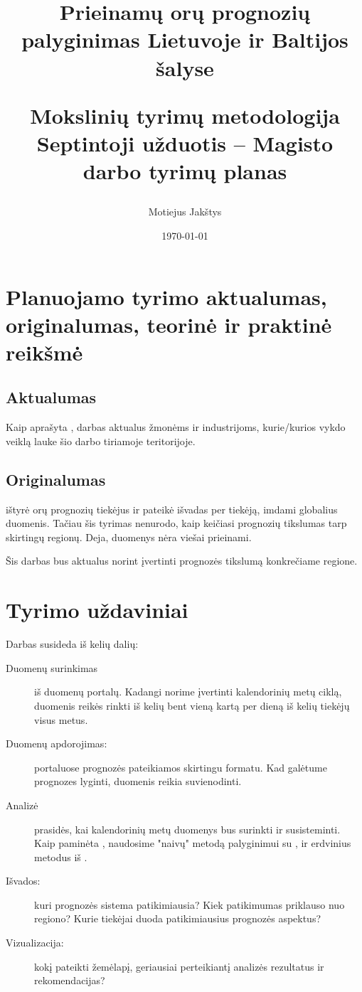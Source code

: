 \documentclass{article}
\title{
    Prieinamų orų prognozių palyginimas Lietuvoje ir Baltijos šalyse \\ \vspace{4mm}

    \large Mokslinių tyrimų metodologija\\
    Septintoji užduotis -- Magisto darbo tyrimų planas
}
\author{Motiejus Jakštys}
\date{\today}
\begin{document}
\maketitle

\newpage

\section{Planuojamo tyrimo aktualumas, originalumas, teorinė ir praktinė reikšmė}

\subsection{Aktualumas}

Kaip aprašyta \cite{motiejus-task6}, darbas aktualus žmonėms ir industrijoms,
kurie/kurios vykdo veiklą lauke šio darbo tiriamoje teritorijoje.

\subsection{Originalumas}

\cite{rose2017analysis} ištyrė orų prognozių tiekėjus ir pateikė išvadas per
tiekėją, imdami globalius duomenis. Tačiau šis tyrimas nenurodo, kaip keičiasi
prognozių tikslumas tarp skirtingų regionų.  Deja, duomenys nėra viešai
prieinami.

Šis darbas bus aktualus norint įvertinti prognozės tikslumą konkrečiame regione.

\section{Tyrimo uždaviniai}
Darbas susideda iš kelių dalių:
\begin{description}
    \item[Duomenų surinkimas] iš duomenų portalų. Kadangi norime įvertinti
        kalendorinių metų ciklą, duomenis reikės rinkti iš kelių bent vieną
        kartą per dieną iš kelių tiekėjų visus metus.
    \item[Duomenų apdorojimas:] portaluose prognozės pateikiamos skirtingu
        formatu. Kad galėtume prognozes lyginti, duomenis reikia suvienodinti.
    \item[Analizė] prasidės, kai kalendorinių metų duomenys bus surinkti
        ir susisteminti. Kaip paminėta \cite{motiejus-task6}, naudosime "naivų"
        metodą palyginimui su \cite{rose2017analysis}, ir erdvinius metodus iš
        \cite{verification2015}.
    \item[Išvados:] kuri prognozės sistema patikimiausia? Kiek patikimumas
        priklauso nuo regiono? Kurie tiekėjai duoda patikimiausius prognozės
        aspektus?
    \item[Vizualizacija:] kokį pateikti žemėlapį, geriausiai perteikiantį
        analizės rezultatus ir rekomendacijas?
\end{description}
\end{document}
